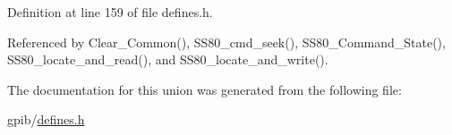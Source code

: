 Definition at line 159 of file defines.\-h.



Referenced by Clear\-\_\-\-Common(), S\-S80\-\_\-cmd\-\_\-seek(), S\-S80\-\_\-\-Command\-\_\-\-State(), S\-S80\-\_\-locate\-\_\-and\-\_\-read(), and S\-S80\-\_\-locate\-\_\-and\-\_\-write().



The documentation for this union was generated from the following file\-:\begin{DoxyCompactItemize}
\item 
gpib/\hyperlink{defines_8h}{defines.\-h}\end{DoxyCompactItemize}
